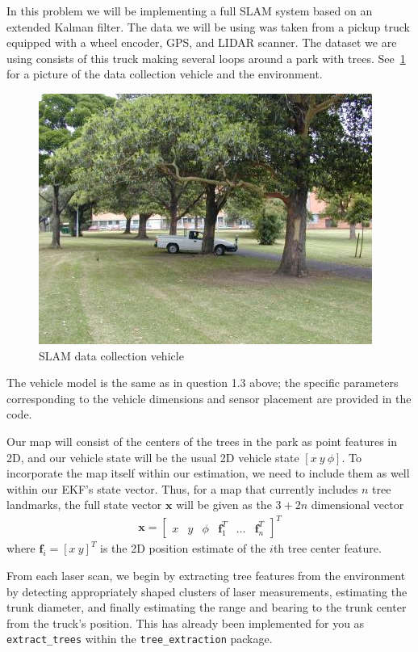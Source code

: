 \documentclass{article}
\newcommand{\mat}[1]{\bm{#1}}
\newcommand{\bmat}[1]{\begin{bmatrix} #1 \end{bmatrix}}
\begin{document}
In this problem we will be implementing a full SLAM system based on an extended Kalman filter.
The data we will be using was taken from a pickup truck equipped with a wheel encoder, GPS, and LIDAR scanner. 
The dataset we are using consists of this truck making several loops around a park with trees. 
See~\ref{fig:vic_truck} for a picture of the data collection vehicle and the environment.
\begin{figure}
    \centering
    \includegraphics[width=0.8\linewidth]{truck.jpg}
    \caption{SLAM data collection vehicle}
    \label{fig:vic_truck}
\end{figure}
The vehicle model is the same as in question 1.3 above; the specific parameters corresponding to the vehicle dimensions and sensor placement are provided in the code.

Our map will consist of the centers of the trees in the park as point features in 2D, and our vehicle state will be the usual 2D vehicle state $[x\ y\ \phi]$.
To incorporate the map itself within our estimation, we need to include them as well within our EKF's state vector.
Thus, for a map that currently includes $n$ tree landmarks, the full state vector $\mat{x}$ will be given as the $3+2n$ dimensional vector
\begin{align}
    \mat{x}= \bmat{x & y & \phi & \mat{f}_1^T & \dots & \mat{f}_n^T}^T
\end{align}
where $\mat{f}_i = [x \ y]^T$ is the 2D position estimate of the $i$th tree center feature. 

From each laser scan, we begin by extracting tree features from the environment by detecting appropriately shaped clusters of laser measurements, estimating the trunk diameter, and finally estimating the range and bearing to the trunk center from the truck's position.
This has already been implemented for you as \texttt{extract\_trees} within the \texttt{tree\_extraction} package.
\end{document}
